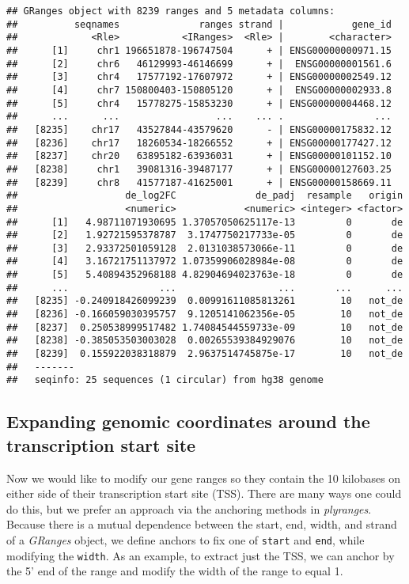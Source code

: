 \documentclass[
]{article}
\begin{document}
\begin{verbatim}
## GRanges object with 8239 ranges and 5 metadata columns:
##          seqnames              ranges strand |            gene_id
##             <Rle>           <IRanges>  <Rle> |        <character>
##      [1]     chr1 196651878-196747504      + | ENSG00000000971.15
##      [2]     chr6   46129993-46146699      + |  ENSG00000001561.6
##      [3]     chr4   17577192-17607972      + | ENSG00000002549.12
##      [4]     chr7 150800403-150805120      + |  ENSG00000002933.8
##      [5]     chr4   15778275-15853230      + | ENSG00000004468.12
##      ...      ...                 ...    ... .                ...
##   [8235]    chr17   43527844-43579620      - | ENSG00000175832.12
##   [8236]    chr17   18260534-18266552      + | ENSG00000177427.12
##   [8237]    chr20   63895182-63936031      + | ENSG00000101152.10
##   [8238]     chr1   39081316-39487177      + | ENSG00000127603.25
##   [8239]     chr8   41577187-41625001      + | ENSG00000158669.11
##                   de_log2FC              de_padj  resample   origin
##                   <numeric>            <numeric> <integer> <factor>
##      [1]   4.98711071930695 1.37057050625117e-13         0       de
##      [2]   1.92721595378787  3.1747750217733e-05         0       de
##      [3]   2.93372501059128  2.0131038573066e-11         0       de
##      [4]   3.16721751137972 1.07359906028984e-08         0       de
##      [5]   5.40894352968188 4.82904694023763e-18         0       de
##      ...                ...                  ...       ...      ...
##   [8235] -0.240918426099239  0.00991611085813261        10   not_de
##   [8236] -0.166059030395757  9.1205141062356e-05        10   not_de
##   [8237]  0.250538999517482 1.74084544559733e-09        10   not_de
##   [8238] -0.385053503003028  0.00265539384929076        10   not_de
##   [8239]  0.155922038318879  2.9637514745875e-17        10   not_de
##   -------
##   seqinfo: 25 sequences (1 circular) from hg38 genome
\end{verbatim}

\hypertarget{expanding-genomic-coordinates-around-the-transcription-start-site}{%
\subsection{Expanding genomic coordinates around the transcription start site}\label{expanding-genomic-coordinates-around-the-transcription-start-site}}

Now we would like to modify our gene ranges so they contain the 10 kilobases on
either side of their transcription start site (TSS). There are many ways one
could do this, but we prefer an approach via the anchoring methods in
\emph{plyranges}. Because there is a mutual dependence between the start, end,
width, and strand of a \emph{GRanges} object, we define anchors to fix one of
\texttt{start} and \texttt{end}, while modifying the \texttt{width}. As an example, to extract just
the TSS, we can anchor by the 5' end of the range and modify the width of the
range to equal 1.
\end{document}

